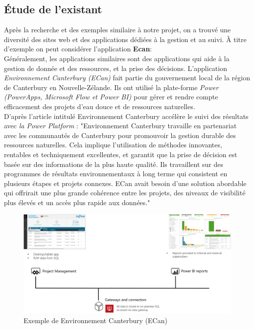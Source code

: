 \documentclass[a4paper]{report}
\begin{document}
\begin{doublespace}
	\subsection{Étude de l’existant}
	Après la recherche et des exemples similaire à notre projet, on a
	trouvé une diversité des sites web et des applications dédiées à la gestion et
	au suivi.
	À titre d'exemple on peut considérer l'application \textbf{\large Ecan}:\\
	Généralement, les applications similaires sont des applications qui
	aide à la gestion de donnée et des ressources, et la prise des décisions.
	L’application \emph{Environnement Canterbury (ECan)} fait partie du
	gouvernement local de la région de Canterbury en Nouvelle-Zélande. Ils ont
	utilisé la plate-forme \emph{Power
		(PowerApps, Microsoft Flow et Power BI)} pour gérer et rendre compte
	efficacement des projets d'eau douce et de ressources naturelles.\\
	D’après l'article intitulé Environnement Canterbury accélère le suivi
	des
	résultats avec \emph{la Power Platform} :
	"Environnement Canterbury travaille en partenariat avec les communautés
	de
	Canterbury pour promouvoir la gestion durable des ressources
	naturelles. Cela
	implique l'utilisation de méthodes innovantes, rentables et
	techniquement
	excellentes, et garantit que la prise de décision est basée sur des
	informations
	de la plus haute qualité. Ils travaillent sur des programmes de
	résultats
	environnementaux à long terme qui consistent en plusieurs étapes et
	projets
	connexes. ECan avait besoin d'une solution abordable qui offrirait une
	plus
	grande cohérence entre les projets, des niveaux de visibilité plus
	élevés et un
	accès plus rapide aux données."
	\begin{figure}[H]
		\begin{center}
			\includegraphics[scale=0.32]{images/example.png}
			\caption{Exemple de Environnement Canterbury (ECan)}
		\end{center}
	\end{figure}
	\newpage

\end{doublespace}
\end{document}
